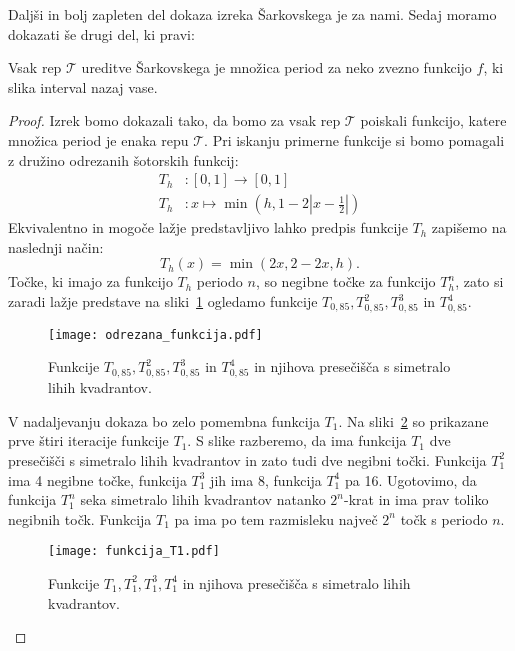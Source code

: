 \documentclass[../TG_magistrsko_delo_sections.tex]{subfiles}
\begin{document}
Daljši in bolj zapleten del dokaza izreka Šarkovskega je za nami. Sedaj moramo dokazati še drugi del, ki pravi:
\begin{izrek}
Vsak rep $\mathcal{T}$ ureditve Šarkovskega je množica period za neko zvezno funkcijo $f$, ki slika interval nazaj vase.
\end{izrek}
\begin{proof}
Izrek bomo dokazali tako, da bomo za vsak rep $\mathcal{T}$ poiskali funkcijo, katere množica period je enaka repu $\mathcal{T}$. Pri iskanju primerne funkcije si bomo pomagali z družino odrezanih šotorskih funkcij:
\begin{equation*} %
\begin{split}
T_h &:  [0, 1] \to [0, 1] \\ 
T_h &: x \mapsto \min \left(h, 1- 2 \left|x-\frac{1}{2} \right|\right)
\end{split}
\end{equation*}
Ekvivalentno in mogoče lažje predstavljivo lahko predpis funkcije $T_h$ zapišemo na naslednji način:
\begin{equation*} %
T_h(x) = \min(2x, 2-2x, h).
\end{equation*}
Točke, ki imajo za funkcijo $T_h$ periodo $n$, so negibne točke za funkcijo $T_h^n$, zato si zaradi lažje predstave na sliki~\ref{fig:Th} ogledamo funkcije $T_{0,85}, T_{0,85}^2, T_{0,85}^3$ in $T_{0,85}^4$. 
\begin{figure}[h]
  \centering
  \texttt{[image: odrezana\_funkcija.pdf]}
  \caption[Primer vektorske slike.]{Funkcije  $T_{0,85}, T_{0,85}^2, T_{0,85}^3$ in $T_{0,85}^4$ in njihova presečišča s simetralo lihih kvadrantov.}
  \label{fig:Th}
\end{figure}

V nadaljevanju dokaza bo zelo pomembna funkcija $T_1$. Na sliki~\ref{fig:T1} so prikazane prve štiri iteracije funkcije $T_1$. S slike razberemo, da ima funkcija $T_1$ dve presečišči s simetralo lihih kvadrantov in zato tudi dve negibni točki. Funkcija $T_1^2$ ima 4 negibne točke, funkcija $T_1^3$ jih ima 8, funkcija $T_1^4$ pa 16. Ugotovimo, da funkcija $T_1^n$ seka simetralo lihih kvadrantov natanko $2^n$-krat in ima prav toliko negibnih točk. Funkcija $T_1$ pa ima po tem razmisleku največ $2^n$ točk s periodo $n$.
\begin{figure}[h]
  \centering
  \texttt{[image: funkcija\_T1.pdf]}
  \caption[Primer vektorske slike.]{Funkcije $T_1, T_1^2, T_1^3, T_1^4$ in njihova presečišča s simetralo lihih kvadrantov.}
  \label{fig:T1}
\end{figure}


\end{proof}
\end{document}
